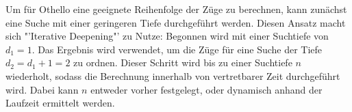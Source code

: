 Um für Othello eine geeignete Reihenfolge der Züge zu berechnen, kann zunächst eine Suche mit einer geringeren Tiefe durchgeführt werden.
Diesen Ansatz macht sich "'Iterative Deepening"' zu Nutze:
Begonnen wird mit einer Suchtiefe von \(d_1=1\).
Das Ergebnis wird verwendet, um die Züge für eine Suche der Tiefe \(d_2=d_1+1=2\) zu ordnen.
Dieser Schritt wird bis zu einer Suchtiefe \(n\) wiederholt, sodass die Berechnung innerhalb von vertretbarer Zeit durchgeführt wird.
Dabei kann \(n\) entweder vorher festgelegt, oder dynamisch anhand der Laufzeit ermittelt werden.
\cite{alphabetaefficiency}


